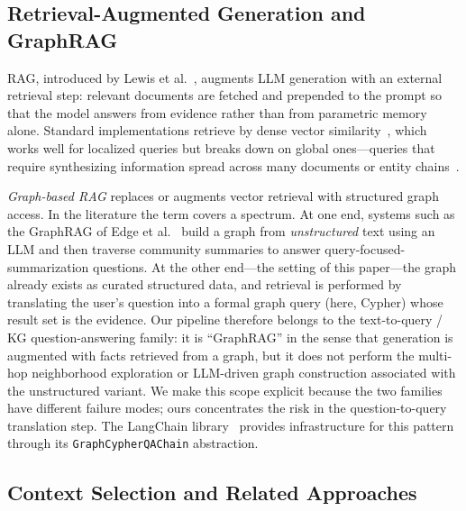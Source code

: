 \documentclass{ceurart}
\begin{document}
\subsection{Retrieval-Augmented Generation and GraphRAG}
\label{sec:rag}

RAG, introduced by Lewis et al.~\cite{lewis2021retrievalaugmentedgenerationknowledgeintensivenlp},
augments LLM generation with an external retrieval step: relevant documents are
fetched and prepended to the prompt so that the model answers from evidence rather
than from parametric memory alone. Standard implementations retrieve by dense
vector similarity~\cite{gao2024retrievalaugmentedgenerationlargelanguage}, which
works well for localized queries but breaks down on global ones---queries that
require synthesizing information spread across many documents or entity
chains~\cite{edge2025localglobalgraphrag}.

\emph{Graph-based RAG} replaces or augments vector retrieval with structured graph
access. In the literature the term covers a spectrum. At one end, systems such as
the GraphRAG of Edge et al.~\cite{edge2025localglobalgraphrag} build a graph from
\emph{unstructured} text using an LLM and then traverse community summaries to
answer query-focused-summarization questions. At the other end---the setting of
this paper---the graph already exists as curated structured data, and retrieval is
performed by translating the user's question into a formal graph query (here,
Cypher) whose result set is the evidence. Our pipeline therefore belongs to the
text-to-query / KG question-answering family: it is ``GraphRAG'' in the sense that
generation is augmented with facts retrieved from a graph, but it does not perform
the multi-hop neighborhood exploration or LLM-driven graph construction associated
with the unstructured variant. We make this scope explicit because the two
families have different failure modes; ours concentrates the risk in the
question-to-query translation step. The LangChain
library~\cite{LangChain2023} provides infrastructure for this pattern through its
\texttt{GraphCypherQAChain} abstraction.

\subsection{Context Selection and Related Approaches}
\end{document}
